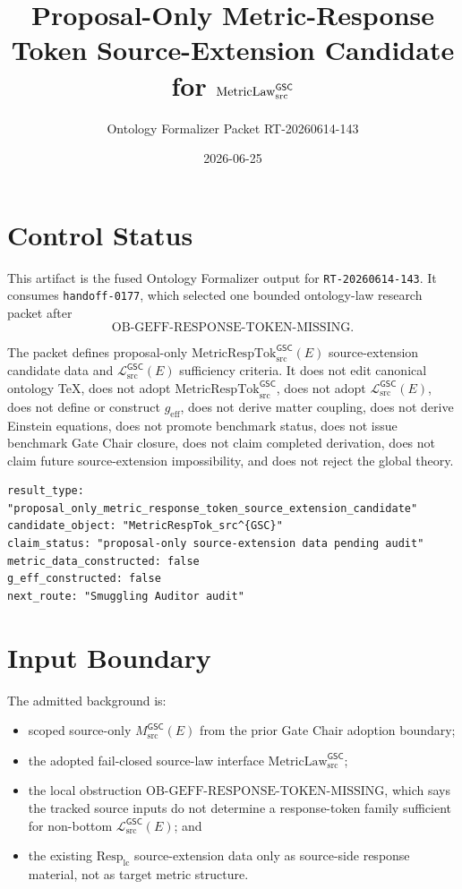 \documentclass[11pt]{article}
\title{Proposal-Only Metric-Response Token Source-Extension Candidate for \(\MetricLaw\)}
\author{Ontology Formalizer Packet RT-20260614-143}
\date{2026-06-25}
\newcommand{\MsrcGSC}{M_{\mathrm{src}}^{\mathsf{GSC}}}
\newcommand{\MetricLaw}{\mathrm{MetricLaw}_{\mathrm{src}}^{\mathsf{GSC}}}
\newcommand{\MetricRespTok}{\mathrm{MetricRespTok}_{\mathrm{src}}^{\mathsf{GSC}}}
\newcommand{\MetricData}{\mathcal{L}_{\mathrm{src}}^{\mathsf{GSC}}}
\newcommand{\geff}{g_{\mathrm{eff}}}
\begin{document}
\maketitle

\section{Control Status}

This artifact is the fused Ontology Formalizer output for
\texttt{RT-20260614-143}. It consumes \texttt{handoff-0177}, which selected
one bounded ontology-law research packet after
\[
  \mathrm{OB\mbox{-}GEFF\mbox{-}RESPONSE\mbox{-}TOKEN\mbox{-}MISSING}.
\]

The packet defines proposal-only \(\MetricRespTok(E)\) source-extension
candidate data and \(\MetricData(E)\) sufficiency criteria. It does not edit
canonical ontology TeX, does not adopt \(\MetricRespTok\), does not adopt
\(\MetricData(E)\), does not define or construct \(\geff\), does not derive
matter coupling, does not derive Einstein equations, does not promote
benchmark status, does not issue benchmark Gate Chair closure, does not claim
completed derivation, does not claim future source-extension impossibility,
and does not reject the global theory.

\begin{verbatim}
result_type: "proposal_only_metric_response_token_source_extension_candidate"
candidate_object: "MetricRespTok_src^{GSC}"
claim_status: "proposal-only source-extension data pending audit"
metric_data_constructed: false
g_eff_constructed: false
next_route: "Smuggling Auditor audit"
\end{verbatim}

\section{Input Boundary}

The admitted background is:
\begin{itemize}[leftmargin=*]
  \item scoped source-only \(\MsrcGSC(E)\) from the prior Gate Chair
  adoption boundary;
  \item the adopted fail-closed source-law interface \(\MetricLaw\);
  \item the local obstruction
  \(\mathrm{OB\mbox{-}GEFF\mbox{-}RESPONSE\mbox{-}TOKEN\mbox{-}MISSING}\),
  which says the tracked source inputs do not determine a response-token
  family sufficient for non-bottom \(\MetricData(E)\); and
  \item the existing \(\mathrm{Resp}_{\mathrm{lc}}\) source-extension data
  only as source-side response material, not as target metric structure.
\end{itemize}
\end{document}
